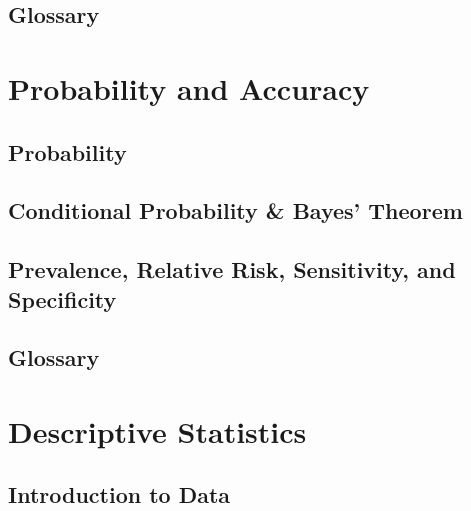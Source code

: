 







\pagestyle{plain}

\maketitle %
% 








\section*{Glossary}


\chapter{Probability and Accuracy } 
\section{Probability}
\section{Conditional Probability \& Bayes’ Theorem}
\section{Prevalence, Relative Risk, Sensitivity, and Specificity}
\section*{Glossary}

\chapter{Descriptive Statistics } 
\section{Introduction to Data}
